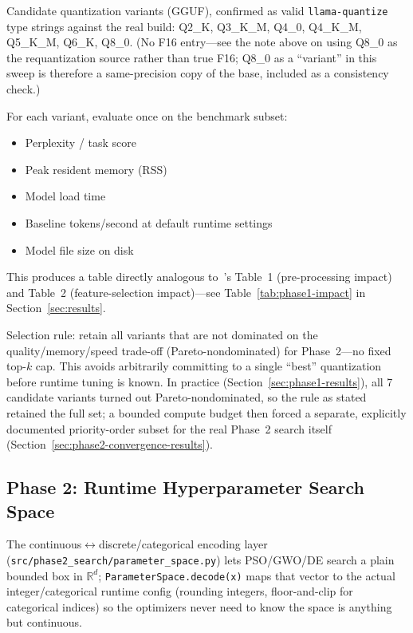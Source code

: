 \documentclass[journal]{IEEEtran}
\begin{document}
Candidate quantization variants (GGUF), confirmed as valid \texttt{llama-quantize} type strings against the real build: Q2\_K, Q3\_K\_M, Q4\_0, Q4\_K\_M, Q5\_K\_M, Q6\_K, Q8\_0. (No F16 entry---see the note above on using Q8\_0 as the requantization source rather than true F16; Q8\_0 as a ``variant'' in this sweep is therefore a same-precision copy of the base, included as a consistency check.)

For each variant, evaluate once on the benchmark subset:
\begin{itemize}
  \item Perplexity / task score
  \item Peak resident memory (RSS)
  \item Model load time
  \item Baseline tokens/second at default runtime settings
  \item Model file size on disk
\end{itemize}

This produces a table directly analogous to~\cite{ref11}'s Table~1 (pre-processing impact) and Table~2 (feature-selection impact)---see Table~\ref{tab:phase1-impact} in Section~\ref{sec:results}.

Selection rule: retain all variants that are not dominated on the quality/memory/speed trade-off (Pareto-nondominated) for Phase~2---no fixed top-$k$ cap. This avoids arbitrarily committing to a single ``best'' quantization before runtime tuning is known. In practice (Section~\ref{sec:phase1-results}), all 7 candidate variants turned out Pareto-nondominated, so the rule as stated retained the full set; a bounded compute budget then forced a separate, explicitly documented priority-order subset for the real Phase~2 search itself (Section~\ref{sec:phase2-convergence-results}).

\subsection{Phase 2: Runtime Hyperparameter Search Space}
\label{sec:phase2-space}

The continuous$\leftrightarrow$discrete/categorical encoding layer (\texttt{src/phase2\_search/parameter\_space.py}) lets PSO/GWO/DE search a plain bounded box in $\mathbb{R}^d$; \texttt{ParameterSpace.decode(x)} maps that vector to the actual integer/categorical runtime config (rounding integers, floor-and-clip for categorical indices) so the optimizers never need to know the space is anything but continuous.
\end{document}
